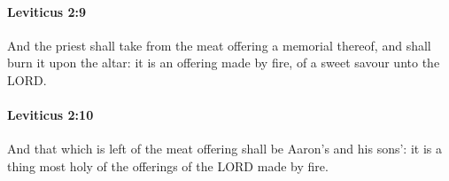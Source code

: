 		\paragraph{Leviticus 2:9} %
			\label{LEVITICUS-2-9}

			And the priest shall take from the meat offering a memorial thereof, and shall burn it upon the altar: it is an offering made by fire, of a sweet savour unto the LORD.


		\paragraph{Leviticus 2:10} %
			\label{LEVITICUS-2-10}

			And that which is left of the meat offering shall be Aaron’s and his sons’: it is a thing most holy of the offerings of the LORD made by fire.


